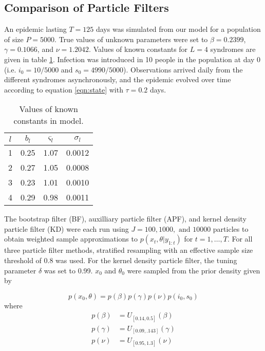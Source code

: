 \documentclass{article}
\begin{document}
\subsection{Comparison of Particle Filters}

An epidemic lasting $T = 125$ days was simulated from our model for a population of size $P = 5000$.  True values of unknown parameters were set to $\beta = 0.2399$, $\gamma = 0.1066$, and $\nu = 1.2042$.  Values of known constants for $L = 4$ syndromes are given in table \ref{tab:true}.  Infection was introduced in 10 people in the population at day 0 (i.e. $i_0 = 10/5000$ and $s_0 = 4990/5000$).  Observations arrived daily from the different syndromes asynchronously, and the epidemic evolved over time according to equation \eqref{eqn:state} with $\tau = 0.2$ days.

\begin{table}[ht]
\begin{center}
\caption{Values of known constants in model.}
\label{tab:true}
\begin{tabular}{|cccc|}
\hline
$l$ & $b_l$ & $\varsigma_l$ & $\sigma_l$ \\
\hline
1 & 0.25 & 1.07 & 0.0012 \\
2 & 0.27 & 1.05 & 0.0008 \\
3 & 0.23 & 1.01 & 0.0010 \\
4 & 0.29 & 0.98 & 0.0011 \\
\hline
\end{tabular}
\end{center}
\end{table}

The bootstrap filter (BF), auxilliary particle filter (APF), and kernel density particle filter (KD) were each run using $J = 100, 1000, \mbox{ and } 10000$ particles to obtain weighted sample approximations to $p(x_t,\theta|y_{1:t})$ for $t = 1,\ldots,T$.  For all three particle filter methods, stratified resampling with an effective sample size threshold of 0.8 was used.  For the kernel density particle filter, the tuning parameter $\delta$ was set to 0.99. $x_0$ and $\theta_0$ were sampled from the prior density given by

\[p\left(x_0,\theta\right) = p\left(\beta\right)p\left(\gamma\right)p\left(\nu\right)p\left(i_0,s_0\right)\] where
\begin{align*}
p(\beta) &= U_{[0.14,0.5]}(\beta) \\
p(\gamma) &= U_{[0.09,.143]}(\gamma) \\
p(\nu) &= U_{[0.95,1.3]}(\nu)
\end{align*}
\end{document}
